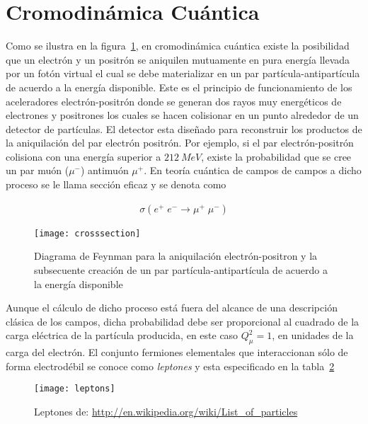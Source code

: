 
\section{Cromodinámica Cuántica}
\label{sec:inter-fuert}

Como se ilustra en la figura~\ref{fig:crosssection}, en cromodinámica cuántica existe la posibilidad que un electrón y un positrón se aniquilen mutuamente en pura energía llevada por un fotón virtual el cual se debe materializar en un par partícula-antipartícula de acuerdo a la energía disponible. Este es el principio de funcionamiento de los aceleradores electrón-positrón donde se generan dos rayos muy energéticos de electrones y positrones los cuales se hacen colisionar en un punto alrededor de un detector de partículas. El detector esta diseñado para reconstruir los productos de la aniquilación del par electrón positrón. Por ejemplo, si el par electrón-positrón colisiona con una energía superior a $\SI{212}{MeV}$, existe la probabilidad que se cree un par muón ($\mu^-$) antimuón $\mu^{+}$. En teoría cuántica de campos de campos a dicho proceso se le llama sección eficaz y se denota como
\begin{frame}
\begin{align}
  \sigma(e^+\;e^-\rightarrow \mu^+\;\mu^-)
\end{align}

\begin{figure}
  \centering
  \texttt{[image: crosssection]}
  \caption{Diagrama de Feynman para la aniquilación electrón-positron y la subsecuente creación de un par partícula-antipartícula de acuerdo a la energía disponible}
  \label{fig:crosssection}
\end{figure}
\end{frame}
Aunque el cálculo de dicho proceso está fuera del alcance de una descripción clásica de los campos, dicha probabilidad debe ser proporcional al cuadrado de la carga eléctrica de la partícula producida, en este caso $Q_{\mu}^2=1$, en unidades de la carga del electrón. El conjunto fermiones elementales que interaccionan sólo de forma electrodébil se conoce como \emph{leptones} y esta especificado en la tabla~\ref{tab:leptons}
\begin{frame}
\begin{figure}
  \centering
  \texttt{[image: leptons]}
  \caption{Leptones de: \url{http://en.wikipedia.org/wiki/List_of_particles}}
  \label{tab:leptons}
\end{figure}
\end{frame}

